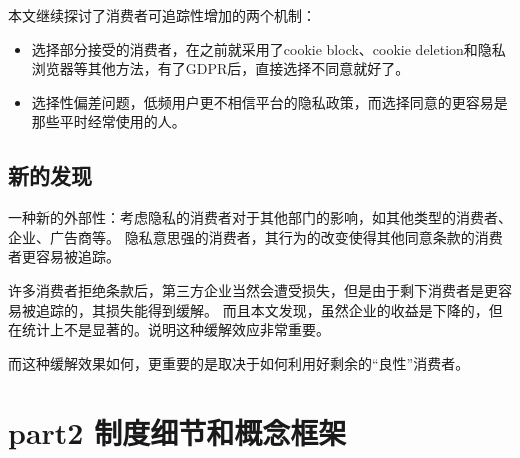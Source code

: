\documentclass{article}
\begin{document}
本文继续探讨了消费者可追踪性增加的两个机制：
\begin{itemize}
    \item 选择部分接受的消费者，在之前就采用了cookie block、cookie deletion和隐私浏览器等其他方法，有了GDPR后，直接选择不同意就好了。
    \item 选择性偏差问题，低频用户更不相信平台的隐私政策，而选择同意的更容易是那些平时经常使用的人。
\end{itemize}

\subsection*{新的发现}
一种新的外部性：考虑隐私的消费者对于其他部门的影响，如其他类型的消费者、企业、广告商等。
隐私意思强的消费者，其行为的改变使得其他同意条款的消费者更容易被追踪。

许多消费者拒绝条款后，第三方企业当然会遭受损失，但是由于剩下消费者是更容易被追踪的，其损失能得到缓解。
而且本文发现，虽然企业的收益是下降的，但在统计上不是显著的。说明这种缓解效应非常重要。

而这种缓解效果如何，更重要的是取决于如何利用好剩余的“良性”消费者。

\section*{part2 制度细节和概念框架}
\end{document}
